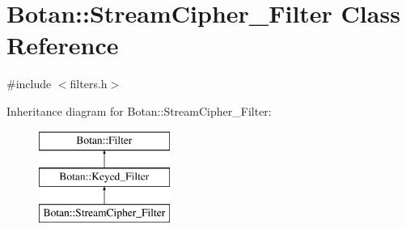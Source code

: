 \hypertarget{classBotan_1_1StreamCipher__Filter}{\section{Botan\-:\-:Stream\-Cipher\-\_\-\-Filter Class Reference}
\label{classBotan_1_1StreamCipher__Filter}
}


{\ttfamily \#include $<$filters.\-h$>$}

Inheritance diagram for Botan\-:\-:Stream\-Cipher\-\_\-\-Filter\-:\begin{figure}[H]
\begin{center}
\leavevmode
\includegraphics[height=3.000000cm]{classBotan_1_1StreamCipher__Filter}
\end{center}
\end{figure}
